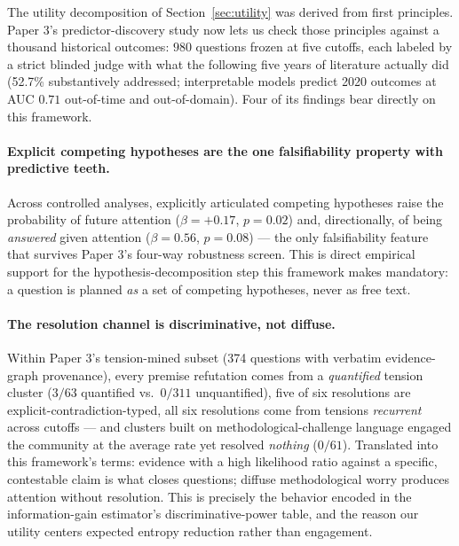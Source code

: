 \documentclass[11pt]{article}
\begin{document}
The utility decomposition of Section~\ref{sec:utility} was derived from
first principles. Paper 3's predictor-discovery study now lets us check
those principles against a thousand historical outcomes: $980$ questions
frozen at five cutoffs, each labeled by a strict blinded judge with what
the following five years of literature actually did (52.7\% substantively
addressed; interpretable models predict 2020 outcomes at AUC $0.71$
out-of-time and out-of-domain). Four of its findings bear directly on
this framework.

\paragraph{Explicit competing hypotheses are the one falsifiability
property with predictive teeth.} Across controlled analyses, explicitly
articulated competing hypotheses raise the probability of future
attention ($\beta = +0.17$, $p = 0.02$) and, directionally, of being
\emph{answered} given attention ($\beta = 0.56$, $p = 0.08$) --- the only
falsifiability feature that survives Paper 3's four-way robustness
screen. This is direct empirical support for the hypothesis-decomposition
step this framework makes mandatory: a question is planned \emph{as} a
set of competing hypotheses, never as free text.

\paragraph{The resolution channel is discriminative, not diffuse.}
Within Paper 3's tension-mined subset (374 questions with verbatim
evidence-graph provenance), every premise refutation comes from a
\emph{quantified} tension cluster ($3/63$ quantified vs.\ $0/311$
unquantified), five of six resolutions are explicit-contradiction-typed,
all six resolutions come from tensions \emph{recurrent} across cutoffs
--- and clusters built on methodological-challenge language engaged the
community at the average rate yet resolved \emph{nothing} ($0/61$).
Translated into this framework's terms: evidence with a high likelihood
ratio against a specific, contestable claim is what closes questions;
diffuse methodological worry produces attention without resolution. This
is precisely the behavior encoded in the information-gain estimator's
discriminative-power table, and the reason our utility centers expected
entropy reduction rather than engagement.
\end{document}
